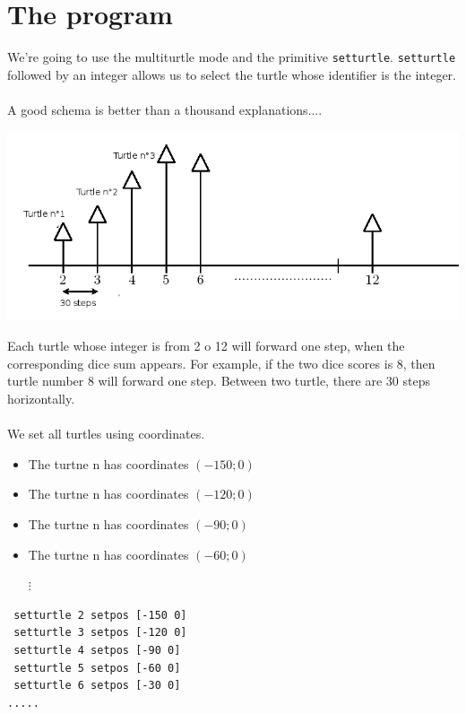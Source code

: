  \section{The program}
  We're going to use the multiturtle mode and the primitive \texttt{setturtle}. \texttt{setturtle} followed by an integer allows us to select the turtle whose identifier is the integer.\\ \\
  A good schema is better than a thousand explanations....
\begin{center}
\includegraphics[scale=0.45]{pics/somme-des-schema.png}
\end{center}
\vspace{0.5cm}
Each turtle whose integer is from 2 o 12 will forward one step, when the corresponding dice sum appears. For example, if the two dice scores is 8, then turtle number 8 will forward one step. Between two turtle, there are 30 steps horizontally.\\ \\
We set all turtles using coordinates.
\begin{itemize}
 \item  The turtne n has coordinates $(-150;0)$
 \item  The turtne n has coordinates $(-120;0)$
 \item  The turtne n has coordinates $(-90;0)$
 \item  The turtne n has coordinates $(-60;0)$\\
\begin{minipage}{8 cm}
\begin{center}
 $\vdots$
\end{center}
\end{minipage}
\end{itemize}
\begin{verbatim}
 setturtle 2 setpos [-150 0]
 setturtle 3 setpos [-120 0]
 setturtle 4 setpos [-90 0]
 setturtle 5 setpos [-60 0]
 setturtle 6 setpos [-30 0]
.....
\end{verbatim}
